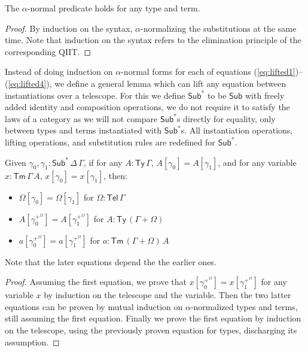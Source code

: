 \documentclass[a4paper,UKenglish,cleveref, autoref, thm-restate]{lipics-v2021}
\newcommand{\Ty}{\mathsf{Ty}}
\newcommand{\Tm}{\mathsf{Tm}}
\newcommand{\Sub}{\mathsf{Sub}}
\newcommand{\Tel}{\mathsf{Tel}}
\begin{document}
\begin{lemma}
  \label{thm:alpha}
  The $\alpha$-normal predicate holds for any type and term.
\end{lemma}
\begin{proof}
  By induction on the syntax, $\alpha$-normalizing the substitutions
  at the same time. Note that induction on the syntax refers to the
  elimination principle of the corresponding QIIT.
\end{proof}

Instead of doing induction on $\alpha$-normal forms for each of equations 
(\ref{eq:lifted1})--(\ref{eq:lifted4}), we define a general lemma which can lift any equation between
instantiations over a telescope. For this we define $\Sub^*$ to be $\Sub$ with
freely added identity and composition operations, we do not require it to
satisfy the laws of a category as we will not compare $\Sub^*$s directly for
equality, only between types and terms instantiated with $\Sub^*$s. All
instantiation operations, lifting operations, and substitution rules are
redefined for $\Sub^*$.
\begin{lemma}
  \label{thm:lifting}
  Given $\gamma_0, \gamma_1 : \Sub^*\,\Delta\,\Gamma$, if for any $A:\Ty\,\Gamma$, $A[\gamma_0] = A[\gamma_1]$, and
  for any variable $x:\Tm\,\Gamma\,A$, $x[\gamma_0] = x[\gamma_1]$,
  then:
  \begin{itemize}
    \item $\Omega[\gamma_0] = \Omega[\gamma_1]$ for $\Omega:\Tel\,\Gamma$
    \item $A[\gamma_0^{+^\Omega}] = A[\gamma_1^{+^\Omega}]$ for $A:\Ty\,(\Gamma+\Omega)$
    \item $a[\gamma_0^{+^\Omega}] = a[\gamma_1^{+^\Omega}]$ for $a:\Tm\,(\Gamma+\Omega)\,A$
  \end{itemize}
  Note that the later equations depend the the earlier ones.
\end{lemma}
\begin{proof}
  Assuming the first equation, we prove that $x[\gamma_0^{+^\Omega}] =
  x[\gamma_1^{+^\Omega}]$ for any variable $x$ by induction on the telescope and
  the variable. Then the two latter equations can be proven by mutual induction
  on $\alpha$-normalized types and terms, still assuming the first equation.
  Finally we prove the first equation by induction on the telescope, using the
  previously proven equation for types, discharging its assumption.
\end{proof}
\end{document}
